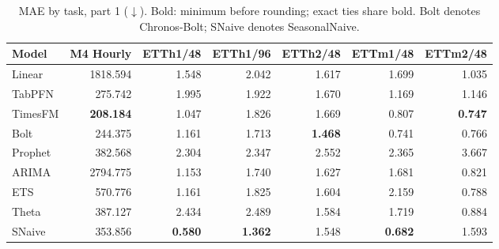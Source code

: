 \begin{table}[!htbp]
\centering
\caption{MAE by task, part 1 ($\downarrow$). Bold: minimum before rounding; exact ties share bold. Bolt denotes Chronos-Bolt; SNaive denotes SeasonalNaive.}
\label{tab:mae1}
\small
\setlength{\tabcolsep}{3.5pt}
\begin{tabular}{lrrrrrr}
\hline
Model & M4 Hourly & ETTh1/48 & ETTh1/96 & ETTh2/48 & ETTm1/48 & ETTm2/48 \\
\hline
Linear & 1818.594 & 1.548 & 2.042 & 1.617 & 1.699 & 1.035 \\
TabPFN & 275.742 & 1.995 & 1.922 & 1.670 & 1.169 & 1.146 \\
TimesFM & \textbf{208.184} & 1.047 & 1.826 & 1.669 & 0.807 & \textbf{0.747} \\
Bolt & 244.375 & 1.161 & 1.713 & \textbf{1.468} & 0.741 & 0.766 \\
Prophet & 382.568 & 2.304 & 2.347 & 2.552 & 2.365 & 3.667 \\
ARIMA & 2794.775 & 1.153 & 1.740 & 1.627 & 1.681 & 0.821 \\
ETS & 570.776 & 1.161 & 1.825 & 1.604 & 2.159 & 0.788 \\
Theta & 387.127 & 2.434 & 2.489 & 1.584 & 1.719 & 0.884 \\
SNaive & 353.856 & \textbf{0.580} & \textbf{1.362} & 1.548 & \textbf{0.682} & 1.593 \\
\hline
\end{tabular}
\end{table}
